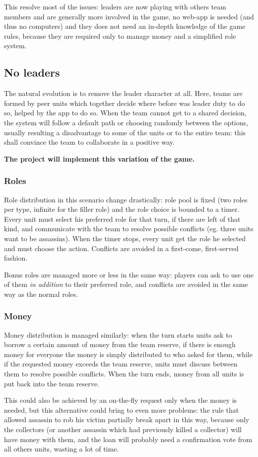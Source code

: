 			This resolve most of the issues: leaders are now playing with others team members and are generally more involved in the game, no web-app is needed (and thus no computers) and they does not need an in-depth knowledge of the game rules, because they are required only to manage money and a simplified role system.
		
		\subsection{No leaders}
		
			The natural evolution is to remove the leader character at all.
			Here, teams are formed by peer units which together decide where before was leader duty to do so, helped by the app to do so.
			When the team cannot get to a shared decision, the system will follow a default path or choosing randomly between the options, usually resulting a disadvantage to some of the units or to the entire team: this shall convince the team to collaborate in a positive way.
			
			\textbf{The project will implement this variation of the game.}
			
			\subsubsection{Roles}
			\label{nolead:role}
				Role distribution in this scenario change drastically: role pool is fixed (two roles per type, infinite for the filler role) and the role choice is bounded to a timer.
				Every unit must select his preferred role for that turn, if there are left of that kind, and communicate with the team to resolve possible conflicts (eg. three units want to be assassins).
				When the timer stops, every unit get the role he selected and must choose the action. Conflicts are avoided in a first-come, first-served fashion.
				
				Bonus roles are managed more or less in the same way: players can ask to use one of them \emph{in addition} to their preferred role, and conflicts are avoided in the same way as the normal roles.
							
			\subsubsection{Money}
			\label{nolead:money}
				Money distribution is managed similarly: when the turn starts units ask to borrow a certain amount of money from the team reserve, if there is enough money for everyone the money is simply distributed to who asked for them, while if the requested money exceeds the team reserve, units must discuss between them to resolve possible conflicts.
				When the turn ends, money from all units is put back into the team reserve.
				
				This could also be achieved by an on-the-fly request only when the money is needed, but this alternative could bring to even more problems: the rule that allowed assassin to rob his victim partially break apart in this way, because only the collectors (or another assassin which had previously killed a collector) will have money with them, and the loan will probably need a confirmation vote from all others units, wasting a lot of time.
		